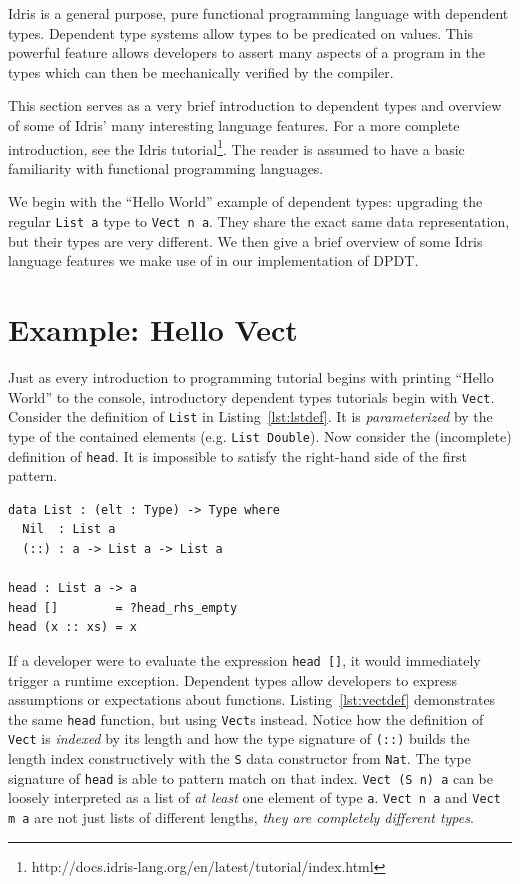 \documentclass[12pt]{report}
\begin{document}
Idris is a general purpose, pure functional programming language with dependent types.
Dependent type systems allow types to be predicated on values.
This powerful feature allows developers to assert many aspects of a program in the types which can then be mechanically verified by the compiler.

This section serves as a very brief introduction to dependent types and overview of some of Idris' many interesting language features.
For a more complete introduction, see the Idris tutorial\footnote{http://docs.idris-lang.org/en/latest/tutorial/index.html}.
The reader is assumed to have a basic familiarity with functional programming languages.

We begin with the ``Hello World'' example of dependent types: upgrading the regular \texttt{List a} type to \texttt{Vect n a}.
They share the exact same data representation, but their types are very different.
We then give a brief overview of some Idris language features we make use of in our implementation of DPDT.

\section{Example: Hello Vect}

Just as every introduction to programming tutorial begins with printing ``Hello World'' to the console, introductory dependent types tutorials begin with \texttt{Vect}.
Consider the definition of \texttt{List} in Listing~\ref{lst:lstdef}.
It is \textit{parameterized} by the type of the contained elements (e.g. \texttt{List Double}).
Now consider the (incomplete) definition of \texttt{head}.
It is impossible to satisfy the right-hand side of the first pattern.

\begin{lstlisting}[float,caption={List Definition},label={lst:listdef}]
data List : (elt : Type) -> Type where
  Nil  : List a
  (::) : a -> List a -> List a

head : List a -> a
head []        = ?head_rhs_empty
head (x :: xs) = x
\end{lstlisting}

If a developer were to evaluate the expression \texttt{head []}, it would immediately trigger a runtime exception.
Dependent types allow developers to express assumptions or expectations about functions.
Listing~\ref{lst:vectdef} demonstrates the same \texttt{head} function, but using \texttt{Vect}s instead.
Notice how the definition of \texttt{Vect} is \textit{indexed} by its length and how the type signature of \texttt{(::)} builds the length index constructively with the \texttt{S} data constructor from \texttt{Nat}.
The type signature of \texttt{head} is able to pattern match on that index.
\texttt{Vect (S n) a} can be loosely interpreted as a list of \textit{at least} one element of type \texttt{a}.
\texttt{Vect n a} and \texttt{Vect m a} are not just lists of different lengths, \textit{they are completely different types}.
\end{document}
